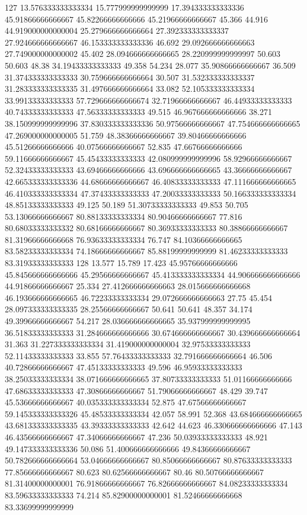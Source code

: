 127 13.576333333333334 15.777999999999999 17.394333333333336 45.91866666666667 45.82266666666666 45.21966666666667 45.366 44.916 44.919000000000004 25.279666666666664 27.392333333333337 27.924666666666667 46.153333333333336 46.692 29.092666666666663 27.749000000000002 45.402 28.094666666666665 28.220999999999997 50.603 50.603 48.38 34.19433333333333 49.358 54.234 28.077 35.90866666666667 36.509 31.374333333333333 30.759666666666664 30.507 31.532333333333337 31.283333333333335 31.497666666666664 33.082 52.105333333333334 33.99133333333333 57.729666666666674 32.71966666666667 46.44933333333333 40.74333333333333 47.56333333333333 49.515 46.967666666666666 38.271 38.150999999999996 37.830333333333336 50.97566666666667 47.754666666666665 47.269000000000005 51.759 48.38366666666667 39.80466666666666 45.51266666666666 40.07566666666667 52.835 47.66766666666666 59.11666666666667 45.45433333333333 42.080999999999996 58.92966666666667 52.32433333333333 43.69466666666666 43.696666666666665 43.36666666666667 42.665333333333336 44.68666666666667 46.40833333333333 47.111666666666665 46.410333333333334 47.37433333333333 47.20033333333333 50.166333333333334 48.85133333333333 49.125 50.189 51.30733333333333 49.853 50.705 53.13066666666667 80.88133333333334 80.90466666666667 77.816 80.68033333333332 80.68166666666667 80.36933333333333 80.38866666666667 81.31966666666668 76.93633333333334 76.747 84.10366666666665 83.58233333333334 74.18666666666667 85.88199999999999 81.46233333333333 83.31933333333333
128 13.577 15.789 17.423 45.95766666666666 45.845666666666666 45.29566666666667 45.413333333333334 44.906666666666666 44.91866666666667 25.334 27.412666666666663 28.015666666666668 46.193666666666665 46.72233333333334 29.072666666666663 27.75 45.454 28.097333333333335 28.25566666666667 50.641 50.641 48.357 34.174 49.39966666666667 54.217 28.036666666666665 35.937999999999995 36.51833333333333 31.284666666666666 30.674666666666667 30.439666666666664 31.363 31.227333333333334 31.419000000000004 32.97533333333333 52.11433333333333 33.855 57.76433333333333 32.791666666666664 46.506 40.72866666666667 47.45133333333333 49.596 46.95933333333333 38.25033333333334 38.071666666666665 37.80733333333333 51.01166666666666 47.68633333333333 47.30866666666667 51.79066666666667 48.429 39.747 45.53666666666667 40.035333333333334 52.875 47.67566666666667 59.145333333333326 45.48533333333334 42.057 58.991 52.368 43.684666666666665 43.681333333333335 43.39333333333333 42.642 44.623 46.330666666666666 47.143 46.43566666666667 47.34066666666667 47.236 50.03933333333333 48.921 49.147333333333336 50.086 51.400666666666666 49.84366666666667 50.782666666666664 53.04666666666667 80.85066666666667 80.87633333333333 77.85666666666667 80.623 80.62566666666667 80.46 80.50766666666667 81.31400000000001 76.91866666666667 76.82666666666667 84.08233333333334 83.59633333333333 74.214 85.82900000000001 81.52466666666668 83.33699999999999

